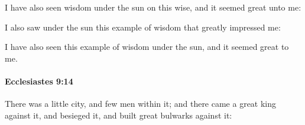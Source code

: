 			\begin{versebox}
					\item[BHS] 
					\item[LXX] 
					\item[ASV] I have also seen wisdom under the sun on this wise, and it seemed great unto me:
					\item[NIV] I also saw under the sun this example of wisdom that greatly impressed me:
					\item[NRSV] I have also seen this example of wisdom under the sun, and it seemed great to me.
			\end{versebox}

		\paragraph{Ecclesiastes 9:14} %
			\label{ECCLESIASTES-9-14}

			There was a little city, and few men within it; and there came a great king against it, and besieged it, and built great bulwarks against it:

